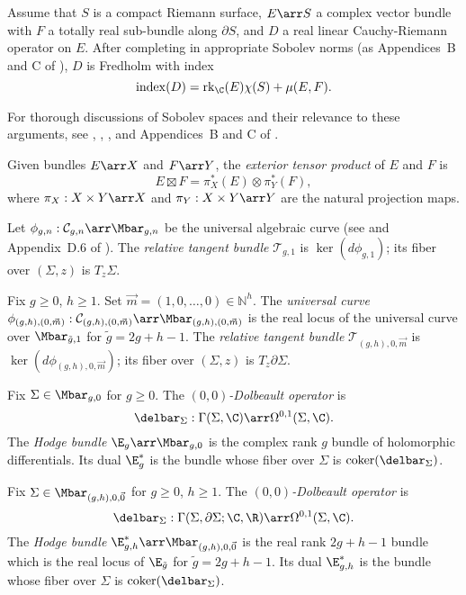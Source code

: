 \begin{theorem}
Assume that $S$ is a compact Riemann surface, $E \arr S$ a complex vector bundle with $F$ a totally real sub-bundle along $\partial S$, and $D$ a real linear Cauchy-Riemann operator on $E$. After completing in appropriate Sobolev norms (as Appendices~B and C of \cite{msBig}), $D$ is Fredholm with index
\[
\ind(D) = \rk_\C(E)\chi(S)+\mu(E,F).
\]
\end{theorem}

\begin{remark}
For thorough discussions of Sobolev spaces and their relevance to these arguments, see \cite{audinDamian}, \cite{dw}, \cite{liu}, and Appendices~B and C of \cite{msBig}.
\end{remark}

\begin{definition} \label{extTensor}
Given bundles $E \arr X$ and $F \arr Y$, the \emph{exterior tensor product} of $E$ and $F$ is
\[
E \boxtimes F = \pi_X^*(E) \otimes \pi_Y^*(F),
\]
where $\pi_X:X \times Y \arr X$ and $\pi_Y:X \times Y \arr Y$ are the natural projection maps.
\end{definition}

\begin{definition} \label{relTan}
Let $\phi_{g,n}:\mathcal{C}_{g,n} \arr \Mbar_{g,n}$ be the universal algebraic curve (see \cite{harris} and Appendix~D.6 of \cite{msBig}). 
The \emph{relative tangent bundle} $\mathcal{T}_{g,1}$ is $\ker(d\phi_{g,1})$; its fiber over $(\Sigma,z)$ is $T_z\Sigma$.

Fix $g \geq 0$, $h \geq 1$. Set $\vec{m}=(1,0,\ldots,0) \in \mathbb{N}^h$. The \emph{universal curve} $\phi_{(g,h),(0,\vec{m})}:\mathcal{C}_{(g,h),(0,\vec{m})} \arr \Mbar_{(g,h),(0,\vec{m})}$ is the real locus of the universal curve over $\Mbar_{\tilde{g},1}$ for $\tilde{g}=2g+h-1$. The \emph{relative tangent bundle} $\mathcal{T}_{(g,h),0,\vec{m}}$ is $\ker(d\phi_{(g,h),0,\vec{m}})$; its fiber over $(\Sigma,z)$ is $T_z\partial\Sigma$.
\end{definition}

\begin{definition} \label{hodge}
Fix $\Sigma \in \Mbar_{g,0}$ for $g \geq 0$. The \emph{$(0,0)$-Dolbeault operator} is
\[
\delbar_\Sigma:\Gamma(\Sigma,\C) \arr \Omega^{0,1}(\Sigma,\C).
\]
The \emph{Hodge bundle} $\E_g \arr \Mbar_{g,0}$ is the complex rank $g$ bundle of holomorphic differentials. Its dual $\E_g^*$ is the bundle whose fiber over $\Sigma$ is $\coker(\delbar_\Sigma)$.

Fix $\Sigma \in \Mbar_{(g,h),0,\vec{0}}$ for $g \geq 0$, $h \geq 1$. The \emph{$(0,0)$-Dolbeault operator} is
\[
\delbar_\Sigma:\Gamma(\Sigma,\partial\Sigma;\C,\R) \arr \Omega^{0,1}(\Sigma,\C).
\]
The \emph{Hodge bundle} $\E_{g,h}^* \arr \Mbar_{(g,h),0,\vec{0}}$ is the real rank $2g+h-1$ bundle which is the real locus of $\E_{\tilde{g}}$ for $\tilde{g}=2g+h-1$. Its dual $\E_{g,h}^*$ is the bundle whose fiber over $\Sigma$ is $\coker(\delbar_\Sigma)$.
\end{definition}

